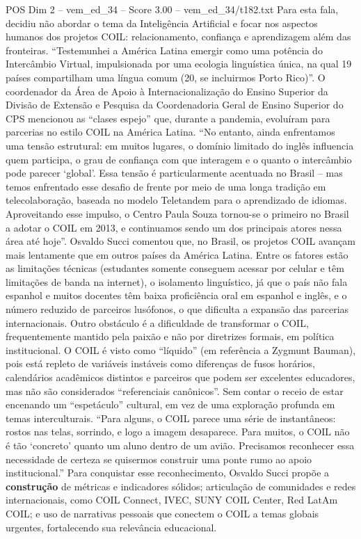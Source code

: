 \begin{textsample}{POS Dim 2 – vem\_ed\_34 – Score 3.00 – vem\_ed\_34/t182.txt}
Para esta fala, decidiu não abordar o tema da Inteligência Artificial e focar nos aspectos humanos dos projetos COIL: relacionamento, confiança e aprendizagem além das fronteiras. “Testemunhei a América Latina emergir como uma potência do Intercâmbio Virtual, impulsionada por uma ecologia linguística única, na qual 19 países compartilham uma língua comum (20, se incluirmos Porto Rico)”.
O coordenador da Área de Apoio à Internacionalização do Ensino Superior da Divisão de Extensão e Pesquisa da Coordenadoria Geral de Ensino Superior do CPS mencionou as “clases espejo” que, durante a pandemia, evoluíram para parcerias no estilo COIL na América Latina. “No entanto, ainda enfrentamos uma tensão estrutural: em muitos lugares, o domínio limitado do inglês influencia quem participa, o grau de confiança com que interagem e o quanto o intercâmbio pode parecer ‘global’.
Essa tensão é particularmente acentuada no Brasil – mas temos enfrentado esse desafio de frente por meio de uma longa tradição em telecolaboração, baseada no modelo Teletandem para o aprendizado de idiomas.
Aproveitando esse impulso, o Centro Paula Souza tornou-se o primeiro no Brasil a adotar o COIL em 2013, e continuamos sendo um dos principais atores nessa área até hoje”.
Osvaldo Succi comentou que, no Brasil, os projetos COIL avançam mais lentamente que em outros países da América Latina.
Entre os fatores estão as limitações técnicas (estudantes somente conseguem acessar por celular e têm limitações de banda na internet), o isolamento linguístico, já que o país não fala espanhol e muitos docentes têm baixa proficiência oral em espanhol e inglês, e o número reduzido de parceiros lusófonos, o que dificulta a expansão das parcerias internacionais.
Outro obstáculo é a dificuldade de transformar o COIL, frequentemente mantido pela paixão e não por diretrizes formais, em política institucional.
O COIL é visto como “líquido” (em referência a Zygmunt Bauman), pois está repleto de variáveis instáveis como diferenças de fusos horários, calendários acadêmicos distintos e parceiros que podem ser excelentes educadores, mas não são considerados “referenciais canônicos”.
Sem contar o receio de estar encenando um “espetáculo” cultural, em vez de uma exploração profunda em temas interculturais. “Para alguns, o COIL parece uma série de instantâneos: rostos nas telas, sorrindo, e logo a imagem desaparece.
Para muitos, o COIL não é tão ‘concreto’ quanto um aluno dentro de um avião.
Precisamos reconhecer essa necessidade de certeza se quisermos construir uma ponte rumo ao apoio institucional.” Para conquistar esse reconhecimento, Osvaldo Succi propõe a \textbf{construção} de métricas e indicadores sólidos; articulação de comunidades e redes internacionais, como COIL Connect, IVEC, SUNY COIL Center, Red LatAm COIL; e uso de narrativas pessoais que conectem o COIL a temas globais urgentes, fortalecendo sua relevância educacional.

\end{textsample}
